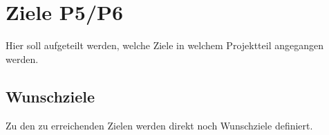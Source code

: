 \section{Ziele P5/P6}
Hier soll aufgeteilt werden, welche Ziele in welchem Projektteil angegangen werden.
\subsection{Wunschziele}
Zu den zu erreichenden Zielen werden direkt noch Wunschziele definiert. 